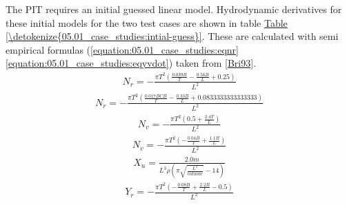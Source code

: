 \documentclass[review]{elsarticle}
\begin{document}
\sphinxAtStartPar
The PIT requires an initial guessed linear model. Hydrodynamic derivatives for these initial models for the two test cases are shown in table \hyperref[\detokenize{05.01_case_studies:intial-guess}]{Table \ref{\detokenize{05.01_case_studies:intial-guess}}}. These are calculated with semi empirical formulas (\autoref{equation:05.01_case_studies:eqnr}\sphinxhyphen{}\autoref{equation:05.01_case_studies:eqyvdot}) taken from {[}\hyperlink{cite.bibligraphy:id45}{Bri93}{]}.
\begin{equation}\label{equation:05.01_case_studies:eqnr}
\begin{split}\displaystyle N_{r} = - \frac{\pi T^{2} \left(\frac{0.039 B}{T} - \frac{0.56 B}{L} + 0.25\right)}{L^{2}}\end{split}
\end{equation}\begin{equation}\label{equation:05.01_case_studies:eqnrdot}
\begin{split}\displaystyle N_{\dot{r}} = - \frac{\pi T^{2} \left(\frac{0.017 B CB}{T} - \frac{0.33 B}{L} + 0.0833333333333333\right)}{L^{2}}\end{split}
\end{equation}\begin{equation}\label{equation:05.01_case_studies:eqnv}
\begin{split}\displaystyle N_{v} = - \frac{\pi T^{2} \left(0.5 + \frac{2.4 T}{L}\right)}{L^{2}}\end{split}
\end{equation}\begin{equation}\label{equation:05.01_case_studies:eqnvdot}
\begin{split}\displaystyle N_{\dot{v}} = - \frac{\pi T^{2} \left(- \frac{0.04 B}{T} + \frac{1.1 B}{L}\right)}{L^{2}}\end{split}
\end{equation}\begin{equation}\label{equation:05.01_case_studies:eqxudot}
\begin{split}\displaystyle X_{\dot{u}} = \frac{2.0 m}{L^{3} \rho \left(\pi \sqrt{\frac{L^{3}}{volume}} - 14\right)}\end{split}
\end{equation}\begin{equation}\label{equation:05.01_case_studies:eqyr}
\begin{split}\displaystyle Y_{r} = - \frac{\pi T^{2} \left(- \frac{0.08 B}{T} + \frac{2.2 B}{L} - 0.5\right)}{L^{2}}\end{split}

\end{equation}
\end{document}
